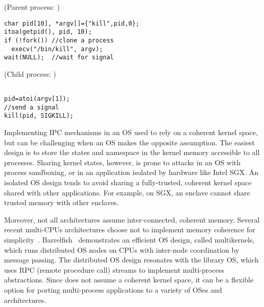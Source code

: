 \begin{figure*}
\begin{minipage}[t]{.65\textwidth}
(Parent process: )
\lstset{basicstyle=\ttfamily\footnotesize,fontadjust=true,breaklines=true}
\begin{lstlisting}
char pid[10], *argv[]={"kill",pid,0};
itoa(getpid(), pid, 10);
if (!fork()) //clone a process
  execv("/bin/kill", argv);
wait(NULL);  //wait for signal
\end{lstlisting}
\end{minipage}
\begin{minipage}[t]{.33\textwidth}
(Child process: )
\lstset{basicstyle=\ttfamily\footnotesize,fontadjust=true,breaklines=true}
\begin{lstlisting}

pid=atoi(argv[1]);
//send a signal
kill(pid, SIGKILL);

\end{lstlisting}
\end{minipage}
\caption{Sample code for Linux applications using process cloning and inter-process communication (IPC).}
\label{fig:overview:proc-example}
\end{figure*}



Implementing IPC mechanisms in an OS used to rely on a coherent kernel space, but can be challenging when an OS makes the opposite assumption.
The easiest design is to store the states and namespace in the kernel memory accessible to all processes.
Sharing kernel states, however, is prone to attacks in an OS with process sandboxing,
or in an application
isolated by hardware like Intel SGX.
An isolated OS design tends to avoid sharing a fully-trusted, coherent kernel space shared with other applications.
For example, on SGX, an enclave cannot share trusted memory with other enclaves.


Moreover, not all architectures assume inter-connected, coherent memory.
Several recent multi-CPUs architectures choose not to implement memory coherence for simplicity~\cite{gschwind2007,cascaval2002evaluation}.
Barrelfish~\cite{baumann09barrelfish} demonstrates an efficient OS design, called multikernels, which runs distributed OS nodes on CPUs with inter-node coordination by message passing.
The distributed OS design resonates with the \graphene{} library OS, which uses RPC (remote procedure call) streams to implement multi-process abstractions.
Since \graphene{} does not assume a coherent kernel space, it can be a flexible option
for porting multi-process applications to a variety of OSes and architectures.



